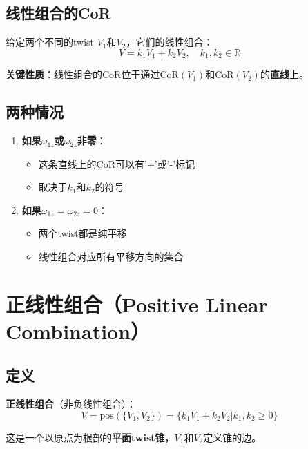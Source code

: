 \documentclass[12pt,a4paper]{article}
\begin{document}
\subsection{线性组合的CoR}

给定两个不同的twist $V_1$和$V_2$，它们的线性组合：
\begin{equation}
V = k_1 V_1 + k_2 V_2, \quad k_1, k_2 \in \mathbb{R}
\label{eq:linear_combination}
\end{equation}

\textbf{关键性质}：线性组合的CoR位于通过$\text{CoR}(V_1)$和$\text{CoR}(V_2)$的\textbf{直线}上。

\subsection{两种情况}

\begin{enumerate}
\item \textbf{如果$\omega_{1z}$或$\omega_{2z}$非零}：
  \begin{itemize}
  \item 这条直线上的CoR可以有'+'或'-'标记
  \item 取决于$k_1$和$k_2$的符号
  \end{itemize}

\item \textbf{如果$\omega_{1z} = \omega_{2z} = 0$}：
  \begin{itemize}
  \item 两个twist都是纯平移
  \item 线性组合对应所有平移方向的集合
  \end{itemize}
\end{enumerate}

\section{正线性组合（Positive Linear Combination）}

\subsection{定义}

\textbf{正线性组合}（非负线性组合）：
\begin{equation}
V = \text{pos}(\{V_1, V_2\}) = \{k_1 V_1 + k_2 V_2 | k_1, k_2 \geq 0\}
\label{eq:positive_combination}
\end{equation}

这是一个以原点为根部的\textbf{平面twist锥}，$V_1$和$V_2$定义锥的边。
\end{document}
